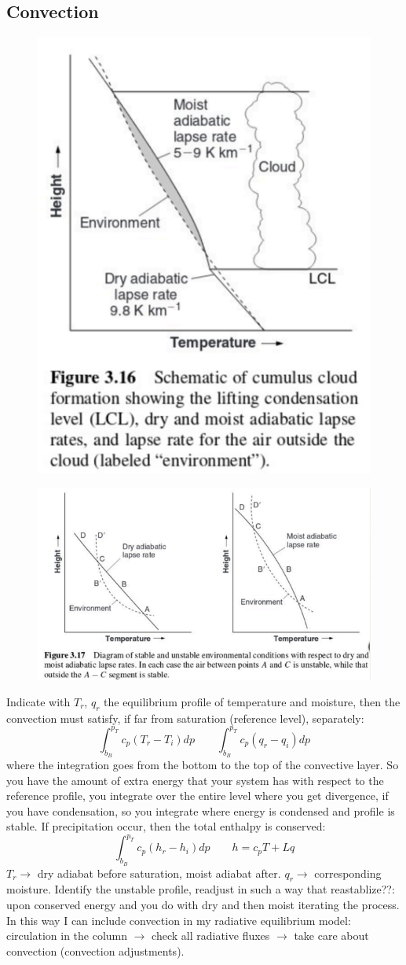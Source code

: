 \subsection{Convection}
\begin{figure}[h!]
    \centering
    \includegraphics[width=0.5\linewidth]{uploads/Screenshot 2024-11-20 130640.png}
    \caption{}
    \label{fig:enter-label}
\end{figure}
\begin{figure}[h!]
    \centering
    \includegraphics[width=0.5\linewidth]{uploads/Screenshot 2024-11-20 130727.png}
    \caption{}
    \label{fig:enter-label}
\end{figure}
Indicate with $T_r$, $q_r$ the equilibrium profile of temperature and moisture, then the convection must satisfy, if far from saturation (reference level), separately:
$$\int_{b_B}^{p_T}c_p(T_r-T_i)dp \qquad \int_{b_B}^{p_T}c_p(q_r-q_i)dp$$
where the integration goes from the bottom to the top of the convective layer. So you have the amount of extra energy that your system has with respect to the reference profile, you integrate over the entire level where you get divergence, if you have condensation, so you integrate where energy is condensed and profile is stable.
If precipitation occur, then the total enthalpy is conserved: 
$$\int_{b_B}^{p_T}c_p(h_r-h_i)dp \qquad h=c_pT+Lq$$
$T_r\rightarrow$ dry adiabat before saturation, moist adiabat after.
$q_r\rightarrow$ corresponding moisture. 
Identify the unstable profile, readjust  in such a way that reastablize??: upon conserved energy and you do with dry and then moist iterating the process. In this way I can include convection in my radiative equilibrium model: circulation in the column $\rightarrow$ check all radiative fluxes $\rightarrow$ take care about convection (convection adjustments).
